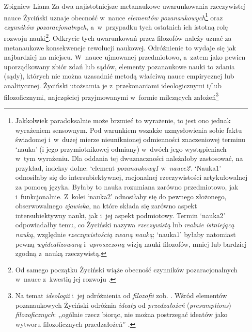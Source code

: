 \begin{artplenv}{Zbigniew Liana}
Za dwa najistotniejsze metanaukowe uwarunkowania rzeczywistej nauce Życiński uznaje obecność w~nauce \textit{elementów
pozanaukowych}\footnote{Jakkolwiek paradoksalnie może brzmieć to wyrażenie, to jest ono jednak wyrażeniem sensownym.
Pod warunkiem wszakże uzmysłowienia sobie faktu świadomej i~w~dużej mierze nieuniknionej odmienności znaczeniowej
terminu `nauka' (i jego przymiotnikowej odmiany) w~dwóch jego wystąpieniach w~tym wyrażeniu. Dla oddania tej
dwuznaczności należałoby zastosować, na przykład, indeksy dolne: `element \textit{pozanaukowy1} w~\textit{nauce2}'.
`Nauka1' odnosiłaby się do intersubiektywnej, racjonalnej rzeczywistości artykułowalnej za pomocą języka. Byłaby to
nauka rozumiana zarówno przedmiotowo, jak i~funkcjonalnie. Z~kolei `nauka2' odnosiłaby się do pewnego złożonego,
obserwowalnego \textit{zjawiska}, na które składa się zarówno aspekt intersubiektywny nauki, jak i~jej aspekt podmiotowy.
Termin `nauka2' odpowiadałby temu, co Życiński nazywa \textit{rzeczywistą }lub\textit{ realnie istniejącą nauką}, względnie
\textit{rzeczywistością zwaną nauką}; `nauka1' byłaby natomiast pewną \textit{wyidealizowaną} i~\textit{uproszczoną }wizją
nauki filozofów, mniej lub bardziej zgodną z~nauką rzeczywistą.} oraz
\textit{czynników pozaracjonalnych}, a~w~przypadku
tych ostatnich ich istotną rolę rozwoju nauki\footnote{Od samego początku Życiński wiąże obecność czynników
pozaracjonalnych w~nauce z~kwestią jej rozwoju
\parencite[zob.][s.~143]{zycinski_jezyk_1983}.
}. Odkrycie
tych uwarunkowań przez filozofów należy uznać za metanaukowe konsekwencje rewolucji naukowej. Odróżnienie to wydaje się
jak najbardziej na miejscu. W~nauce ujmowanej przedmiotowo, a~zatem jako pewien uporządkowany zbiór zdań lub sądów,
elementy pozanaukowe nauki to zdania (sądy), których nie można uzasadnić metodą właściwą nauce empirycznej lub
analitycznej. Życiński utożsamia je z~przekonaniami ideologicznymi i/lub filozoficznymi, najczęściej przyjmowanymi w~formie
milczących założeń\footnote{Na temat \textit{ideologii} i~jej odróżnienia od \textit{filozofii}
zob. \parencites[s.~18]{zycinski_structure_1988}[s.~33]{zycinski_struktura_2013}.
Wśród elementów pozanaukowych
Życiński odróżnia \textit{ideaty} od \textit{przedzałożeń} (\textit{presumptions}) \textit{filozoficznych}: ,,ogólnie rzecz
biorąc, nie można postrzegać ideatów jako wytworu filozoficznych przedzałożeń''
\parencites[s.~29]{zycinski_structure_1988}[s.~51]{zycinski_struktura_2013}.
}
\end{artplenv}
